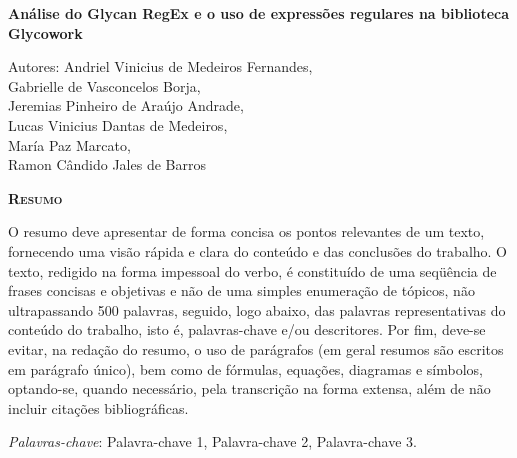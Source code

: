 \begin{center}
	{\Large{\textbf{Análise do Glycan RegEx e o uso de expressões regulares na biblioteca Glycowork}}}
\end{center}

\vspace{1cm}

\begin{flushright}
	Autores: Andriel Vinicius de Medeiros Fernandes, \\
	Gabrielle de Vasconcelos Borja, \\
	Jeremias Pinheiro de Araújo Andrade, \\
	Lucas Vinicius Dantas de Medeiros, \\
	María Paz Marcato, \\
	Ramon Cândido Jales de Barros \\
\end{flushright}

\vspace{1cm}

\begin{center}
	\Large{\textsc{\textbf{Resumo}}}
\end{center}

\noindent O resumo deve apresentar de forma concisa os pontos relevantes de um texto, fornecendo uma visão rápida e clara do conteúdo e das conclusões do trabalho. O texto, redigido na forma impessoal do verbo, é constituído de uma seqüência de frases concisas e objetivas e não de uma simples enumeração de tópicos, não ultrapassando 500 palavras, seguido, logo abaixo, das palavras representativas do conteúdo do trabalho, isto é, palavras-chave e/ou descritores. Por fim, deve-se evitar, na redação do resumo, o uso de parágrafos (em geral resumos são escritos em parágrafo único), bem como de fórmulas, equações, diagramas e símbolos, optando-se, quando necessário, pela transcrição na forma extensa, além de não incluir citações bibliográficas.

\noindent\textit{Palavras-chave}: Palavra-chave 1, Palavra-chave 2, Palavra-chave 3.